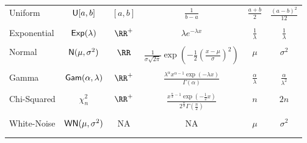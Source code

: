 \begin{longtable}{lccccc}
    Uniform           & ${\sf U} [a,b]$             & $[a,b]$                        & $\frac{1}{b-a}$                                                                                          & $\frac{a+b}{2}$          & $\frac{(a-b)^2}{12}$       \\\\
    Exponential       & ${\sf Exp} (\lambda)$         & $\RR^{+}$                      & $\lambda e^{-\lambda x}$                                                                                 & $\frac{1}{\lambda}$      & $\frac{1}{\lambda}$        \\\\
    Normal            & ${\sf N} (\mu, \sigma^2)$   & $\RR$                          & $\frac{1}{\sigma \sqrt{2 \pi}} \exp \left( -\frac{1}{2} \left( \frac{x - \mu}{\sigma} \right)^2 \right)$ & $\mu$                    & $\sigma^2$                 \\\\
    Gamma             & ${\sf Gam} (\alpha, \lambda)$ & $\RR^{+}$                      & $\frac{\lambda^{\alpha} x^{\alpha - 1} \exp (-\lambda x)}{\Gamma (\alpha)}$                              & $\frac{\alpha}{\lambda}$ & $\frac{\alpha}{\lambda^2}$ \\\\
    Chi-Squared       & $\chi^2_{n}$             & $\RR^{+}$                      & $\frac{x^{\frac{n}{2} - 1} \exp (-\frac{1}{2} x)}{2^{\frac{n}{2}} \Gamma (\frac{n}{2})}$                 & $n$                      & $2n$                       \\\\
    White-Noise       & ${\sf WN} (\mu , \sigma^2)$   & NA                             & NA                                                                                                       & $\mu$                    & $\sigma^2$                 \\\\

    \\\bottomrule
    \hline
\end{longtable}